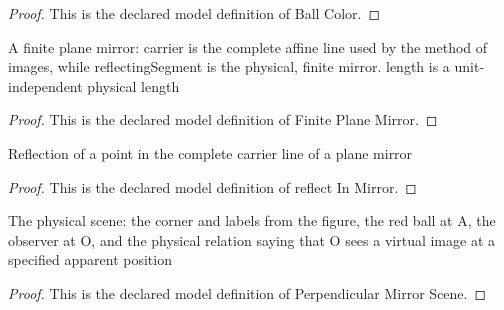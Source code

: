\begin{proof}
  This is the declared model definition of Ball Color.
\end{proof}
\begin{definition}
  \label{def:physics:phyx-mini-0068:phyxminiproblems-problemphyxmini0068-finiteplanemirror}
  A finite plane mirror: carrier is the complete affine line used by the method of images, while reflectingSegment is the physical, finite mirror. length is a unit-independent physical length
\end{definition}
\begin{proof}
  This is the declared model definition of Finite Plane Mirror.
\end{proof}
\begin{definition}
  \label{def:physics:phyx-mini-0068:phyxminiproblems-problemphyxmini0068-reflectinmirror}
  Reflection of a point in the complete carrier line of a plane mirror
\end{definition}
\begin{proof}
  This is the declared model definition of reflect In Mirror.
\end{proof}
\begin{definition}
  \label{def:physics:phyx-mini-0068:phyxminiproblems-problemphyxmini0068-perpendicularmirrorscene}
  The physical scene: the corner and labels from the figure, the red ball at A, the observer at O, and the physical relation saying that O sees a virtual image at a specified apparent position
\end{definition}
\begin{proof}
  This is the declared model definition of Perpendicular Mirror Scene.
\end{proof}
